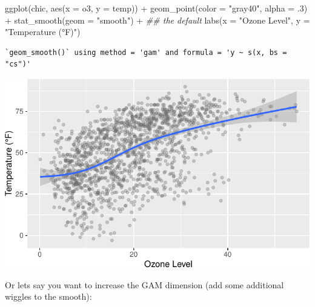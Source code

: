 \documentclass[
  letterpaper,
]{scrbook}
\newenvironment{Shaded}{\begin{snugshade}}{\end{snugshade}}
\newcommand{\AttributeTok}[1]{\textcolor[rgb]{0.40,0.45,0.13}{#1}}
\newcommand{\DecValTok}[1]{\textcolor[rgb]{0.68,0.00,0.00}{#1}}
\newcommand{\DocumentationTok}[1]{\textcolor[rgb]{0.37,0.37,0.37}{\textit{#1}}}
\newcommand{\FunctionTok}[1]{\textcolor[rgb]{0.28,0.35,0.67}{#1}}
\newcommand{\NormalTok}[1]{\textcolor[rgb]{0.00,0.23,0.31}{#1}}
\newcommand{\SpecialCharTok}[1]{\textcolor[rgb]{0.37,0.37,0.37}{#1}}
\newcommand{\StringTok}[1]{\textcolor[rgb]{0.13,0.47,0.30}{#1}}
\begin{document}
\begin{tcolorbox}
\begin{Shaded}
\begin{Highlighting}[]
\FunctionTok{ggplot}\NormalTok{(chic, }\FunctionTok{aes}\NormalTok{(}\AttributeTok{x =}\NormalTok{ o3, }\AttributeTok{y =}\NormalTok{ temp)) }\SpecialCharTok{+}
  \FunctionTok{geom\_point}\NormalTok{(}\AttributeTok{color =} \StringTok{"gray40"}\NormalTok{, }\AttributeTok{alpha =}\NormalTok{ .}\DecValTok{3}\NormalTok{) }\SpecialCharTok{+}
  \FunctionTok{stat\_smooth}\NormalTok{(}\AttributeTok{geom =} \StringTok{"smooth"}\NormalTok{) }\SpecialCharTok{+} \DocumentationTok{\#\# the default}
  \FunctionTok{labs}\NormalTok{(}\AttributeTok{x =} \StringTok{"Ozone Level"}\NormalTok{, }\AttributeTok{y =} \StringTok{"Temperature (°F)"}\NormalTok{)}
\end{Highlighting}
\end{Shaded}

\begin{verbatim}
`geom_smooth()` using method = 'gam' and formula = 'y ~ s(x, bs = "cs")'
\end{verbatim}

\includegraphics{ch17_files/figure-pdf/geom-stat-smooth-b-1.pdf}

\end{tcolorbox}

Or lets say you want to increase the GAM dimension (add some additional
wiggles to the smooth):
\end{document}
